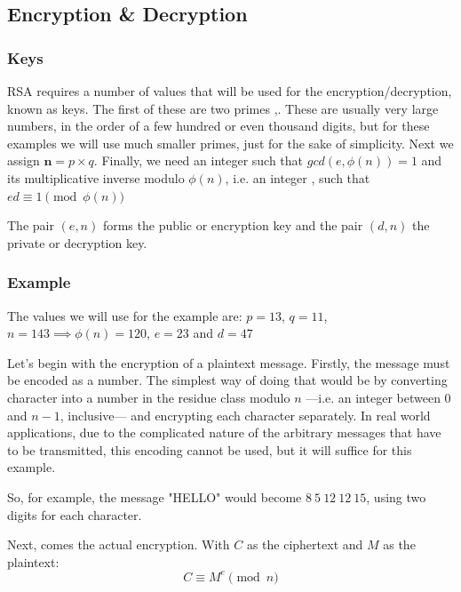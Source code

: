\documentclass[12pt, titlepage]{article}
\begin{document}
    \subsection{Encryption \& Decryption}
        \subsubsection{Keys}
        RSA requires a number of values that will be used for the encryption/decryption,
        known as keys.  The first of these are two primes ,. These are
        usually very large numbers, in the order of a few hundred or even thousand digits,
        but for these examples we will use much smaller primes, just for the sake of
        simplicity. Next we assign $\pmb{n}=p \times q$.  Finally, we need an integer
         such that $gcd(e, \phi (n)) = 1$ and its multiplicative inverse modulo
        $\phi(n)$, i.e. an integer , such that $ed \equiv 1 \pmod{\phi(n)}$

        The pair $(e, n)$ forms the public or encryption key and the pair $(d, n)$ the private
        or decryption key.


        \subsubsection{Example}
        The values we will use for the example are: $p=13$, $q=11$, $n=143 \implies \phi (n) =
        120$, $e = 23$ and $d = 47$

        Let's begin with the encryption of a plaintext message. Firstly, the message must be
        encoded as a number. The simplest way of doing that would be by converting character
        into a number in the residue class modulo $n$ ---i.e. an integer between $0$ and
        $n-1$, inclusive--- and encrypting each character separately.  In real world
        applications, due to the complicated nature of the arbitrary messages that have to
        be transmitted, this encoding cannot be used, but it will suffice for this example.

        So, for example, the message "HELLO" would become $8\ 5\ 12\ 12\ 15$, using two digits
        for each character.

        Next, comes the actual encryption. With $C$ as the ciphertext and $M$ as the plaintext:
        \begin{equation*}
            C \equiv M^{e} \pmod{n}
        \end{equation*}
\end{document}
